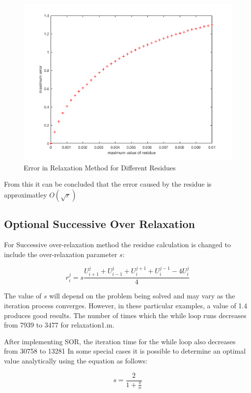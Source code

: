 \documentclass[11pt, oneside, titlepage]{article}   	%
\begin{document}
\begin{figure}[H]
	\includegraphics[width = \textwidth]{exercise5_2}
	\caption{Error in Relaxation Method for Different Residues} \label{fig:ex5_2}
\end{figure}

From this it can be concluded that the error caused by the residue is approximatley $O(\sqrt{r})$

\subsection{Optional Successive Over Relaxation}

For Successive over-relaxation method the residue calculation is changed to include the over-relaxation parameter $s$:

\[r_i^j=s\frac{U_{i+1}^j+U_{i-1}^j+U_{i}^{j+1}+U_{i}^{j-1}-4U_i^j}{4}\]

The value of $s$ will depend on the problem being solved and may vary as the iteration process converges. However, in these particular examples, a value of 1.4 produces good results. The number of times which the while loop runs decreases from 7939 to 3477 for relaxation1.m.
 
After implementing SOR, the iteration time for the while loop also decreases from 30758 to 13281 
In some special cases it is possible to determine an optimal value analytically using the equation as follows:

\[s=\frac{2}{1+\frac{\pi}{n}}\]
\end{document}
